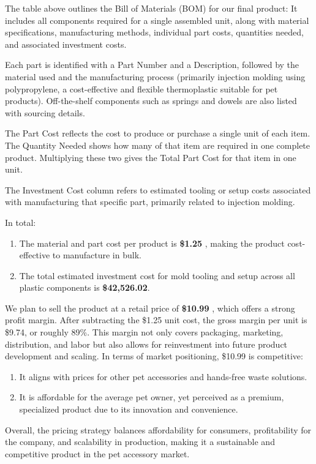 \documentclass[12pt]{article}
\theoremstyle{definition} %
\theoremstyle{plain} %
\begin{document}
The table above outlines the Bill of Materials (BOM) for our final product: It includes
all components required for a single assembled unit, along with material specifications,
manufacturing methods, individual part costs, quantities needed, and associated investment
costs.

Each part is identified with a Part Number and a Description, followed by the material
used and the manufacturing process (primarily injection molding using polypropylene, a
cost-effective and flexible thermoplastic suitable for pet products). Off-the-shelf components
such as springs and dowels are also listed with sourcing details.

The Part Cost reflects the cost to produce or purchase a single unit of each item. The
Quantity Needed shows how many of that item are required in one complete product.
Multiplying these two gives the Total Part Cost for that item in one unit.

The Investment Cost column refers to estimated tooling or setup costs associated
with manufacturing that specific part, primarily related to injection molding.

In total:
\noindent
\begin{enumerate}
  \item The material and part cost per product is \textbf{\$1.25} , making the product cost-effective to
  manufacture in bulk.
\item The total estimated investment cost for mold tooling and setup across all plastic
components is \textbf{\$42,526.02}.
\end{enumerate}

We plan to sell the product at a retail price of \textbf{\$10.99} , which offers a strong profit margin.
After subtracting the \$1.25 unit cost, the gross margin per unit is \$9.74, or roughly 89\%. This
margin not only covers packaging, marketing, distribution, and labor but also allows for
reinvestment into future product development and scaling.
In terms of market positioning, \$10.99 is competitive:

\noindent
\begin{enumerate}
  \item It aligns with prices for other pet accessories and hands-free waste solutions.
  \item It is affordable for the average pet owner, yet perceived as a premium, specialized
  product due to its innovation and convenience.
\end{enumerate}
\vspace{.5cm} 
Overall, the pricing strategy balances affordability for consumers, profitability for the
company, and scalability in production, making it a sustainable and competitive product in
the pet accessory market.
\end{document}
